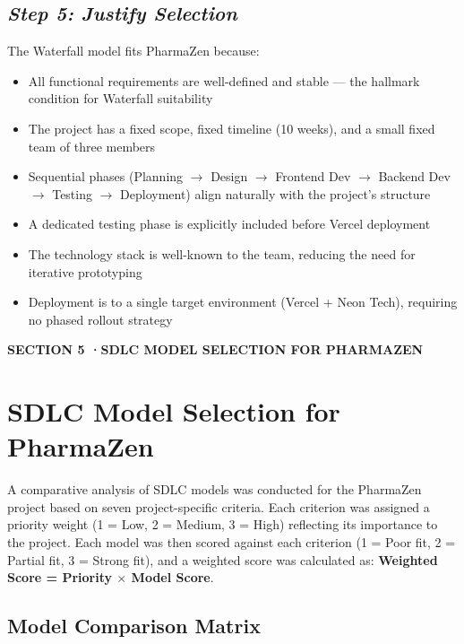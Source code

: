 \documentclass[12pt, a4paper]{article}
\newcommand{\sectionbadge}[2]{%
  \vspace{12pt}\noindent
  \colorbox{pharmagreen}{%
    \parbox{\dimexpr\textwidth-2\fboxsep\relax}{%
      \vspace{4pt}
      \color{white}\small\bfseries\MakeUppercase{Section #1 \quad·\quad #2}
      \vspace{4pt}
    }%
  }\vspace{6pt}
}
\begin{document}
\subsection*{\textit{Step 5: Justify Selection}}

The Waterfall model fits PharmaZen because:
\begin{itemize}[leftmargin=1.5em, itemsep=4pt]
  \item All functional requirements are well-defined and stable — the hallmark condition for Waterfall suitability
  \item The project has a fixed scope, fixed timeline (10 weeks), and a small fixed team of three members
  \item Sequential phases (Planning $\rightarrow$ Design $\rightarrow$ Frontend Dev $\rightarrow$ Backend Dev $\rightarrow$ Testing $\rightarrow$ Deployment) align naturally with the project's structure
  \item A dedicated testing phase is explicitly included before Vercel deployment
  \item The technology stack is well-known to the team, reducing the need for iterative prototyping
  \item Deployment is to a single target environment (Vercel + Neon Tech), requiring no phased rollout strategy
\end{itemize}

\newpage
\sectionbadge{5}{SDLC Model Selection for PharmaZen}
\section{SDLC Model Selection for PharmaZen}

A comparative analysis of SDLC models was conducted for the PharmaZen project based on seven project-specific criteria. Each criterion was assigned a priority weight (1 = Low, 2 = Medium, 3 = High) reflecting its importance to the project. Each model was then scored against each criterion (1 = Poor fit, 2 = Partial fit, 3 = Strong fit), and a weighted score was calculated as: \textbf{Weighted Score = Priority $\times$ Model Score}.

\subsection{Model Comparison Matrix}
\end{document}
